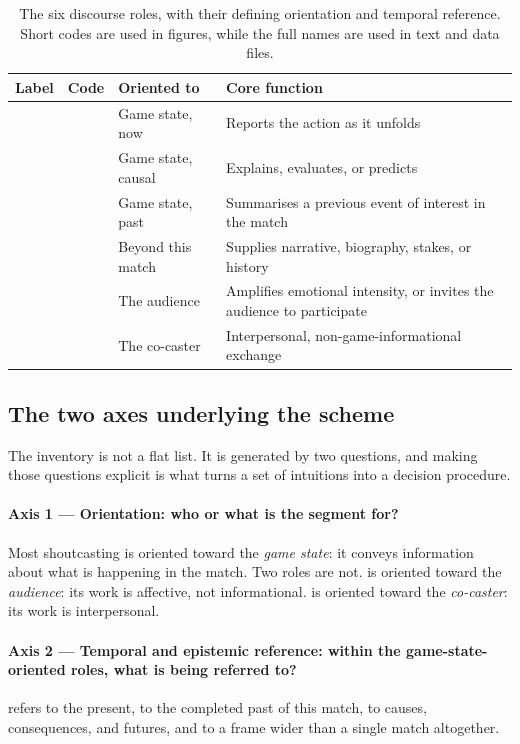 \begin{table}[htbp]
\centering
\caption{The six discourse roles, with their defining orientation and
temporal reference. Short codes are used in figures, while the full names are used in text and data files.}
\label{tab:inventory}
\small
\renewcommand{\arraystretch}{1.35}
\begin{tabularx}{\textwidth}{@{}l l l X@{}}
\toprule
\textbf{Label} & \textbf{Code} & \textbf{Oriented to} & \textbf{Core function} \\
\midrule
\PBP{}  & \cPBP{} & Game state, now      & Reports the action as it unfolds \\
\SA{}   & \cSA{}  & Game state, causal   & Explains, evaluates, or predicts \\
\REC{}  & \cREC{} & Game state, past     & Summarises a previous event of interest in the match \\
\STO{}  & \cSTO{} & Beyond this match    & Supplies narrative, biography, stakes, or history \\
\HYP{}  & \cHYP{} & The audience         & Amplifies emotional intensity, or invites the audience to participate \\
\BAN{}  & \cBAN{} & The co-caster        & Interpersonal, non-game-informational exchange \\
\bottomrule
\end{tabularx}
\end{table}

\subsection{The two axes underlying the scheme}
\label{sec:axes}

The inventory is not a flat list. It is generated by two questions, and making those questions explicit is what turns a set of intuitions into a decision procedure.

\paragraph{Axis 1 --- Orientation: who or what is the segment for?} Most shoutcasting is oriented toward the \emph{game state}: it conveys information about what is happening in the match. Two roles are not. \HYP{} is oriented toward the \emph{audience}: its work is affective, not informational. \BAN{} is oriented toward the \emph{co-caster}: its work is interpersonal.

\paragraph{Axis 2 --- Temporal and epistemic reference: within the game-state-oriented roles, what is being referred to?} \PBP{} refers to the present, \REC{} to the completed past of this match, \SA{} to causes, consequences, and futures, and \STO{} to a frame wider than a single match altogether.

